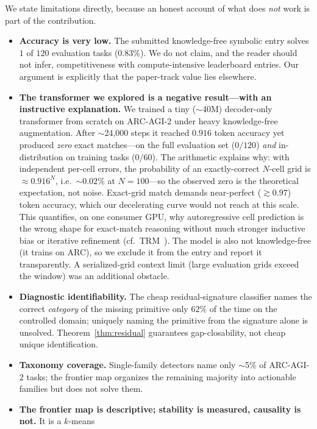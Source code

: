 We state limitations directly, because an honest account of what does \emph{not} work is part of the
contribution.

\begin{itemize}[leftmargin=1.4em,itemsep=2pt]
  \item \textbf{Accuracy is very low.} The submitted knowledge-free symbolic entry solves $1$ of $120$
  evaluation tasks ($0.83\%$). We do not claim, and the reader should not infer, competitiveness with
  compute-intensive leaderboard entries. Our argument is explicitly that the paper-track value lies elsewhere.
  \item \textbf{The transformer we explored is a negative result---with an instructive explanation.} We
  trained a tiny ($\sim$40M) decoder-only transformer from scratch on ARC-AGI-2 under heavy knowledge-free
  augmentation. After $\sim$24{,}000 steps it reached $0.916$ token accuracy yet produced \emph{zero} exact
  matches---on the full evaluation set ($0/120$) \emph{and} in-distribution on training tasks ($0/60$). The
  arithmetic explains why: with independent per-cell errors, the probability of an exactly-correct $N$-cell
  grid is $\approx 0.916^{N}$, i.e.\ $\sim 0.02\%$ at $N{=}100$---so the observed zero is the theoretical
  expectation, not noise. Exact-grid match demands near-perfect ($\gtrsim 0.97$) token accuracy, which our
  decelerating curve would not reach at this scale. This quantifies, on one consumer GPU, why autoregressive
  cell prediction is the wrong shape for exact-match reasoning without much stronger inductive bias or
  iterative refinement (cf.\ TRM~\cite{jolicoeur2025trm}). The model is also not knowledge-free (it trains on
  ARC), so we exclude it from the entry and report it transparently. A serialized-grid context limit (large
  evaluation grids exceed the window) was an additional obstacle.
  \item \textbf{Diagnostic identifiability.} The cheap residual-signature classifier names the correct
  \emph{category} of the missing primitive only $62\%$ of the time on the controlled domain; uniquely naming
  the primitive from the signature alone is unsolved. Theorem~\ref{thm:residual} guarantees gap-closability,
  not cheap unique identification.
  \item \textbf{Taxonomy coverage.} Single-family detectors name only $\sim$5\% of ARC-AGI-2 tasks; the
  frontier map organizes the remaining majority into actionable families but does not solve them.
  \item \textbf{The frontier map is descriptive; stability is measured, causality is not.} It is a $k$-means

\end{itemize}
